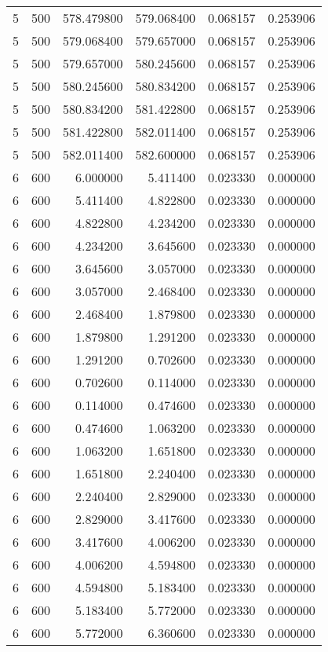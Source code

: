 \begin{longtable}{rrrrrr}
5 & 500 & 578.479800 & 579.068400 & 0.068157 & 0.253906 \\
5 & 500 & 579.068400 & 579.657000 & 0.068157 & 0.253906 \\
5 & 500 & 579.657000 & 580.245600 & 0.068157 & 0.253906 \\
5 & 500 & 580.245600 & 580.834200 & 0.068157 & 0.253906 \\
5 & 500 & 580.834200 & 581.422800 & 0.068157 & 0.253906 \\
5 & 500 & 581.422800 & 582.011400 & 0.068157 & 0.253906 \\
5 & 500 & 582.011400 & 582.600000 & 0.068157 & 0.253906 \\
6 & 600 & 6.000000 & 5.411400 & 0.023330 & 0.000000 \\
6 & 600 & 5.411400 & 4.822800 & 0.023330 & 0.000000 \\
6 & 600 & 4.822800 & 4.234200 & 0.023330 & 0.000000 \\
6 & 600 & 4.234200 & 3.645600 & 0.023330 & 0.000000 \\
6 & 600 & 3.645600 & 3.057000 & 0.023330 & 0.000000 \\
6 & 600 & 3.057000 & 2.468400 & 0.023330 & 0.000000 \\
6 & 600 & 2.468400 & 1.879800 & 0.023330 & 0.000000 \\
6 & 600 & 1.879800 & 1.291200 & 0.023330 & 0.000000 \\
6 & 600 & 1.291200 & 0.702600 & 0.023330 & 0.000000 \\
6 & 600 & 0.702600 & 0.114000 & 0.023330 & 0.000000 \\
6 & 600 & 0.114000 & 0.474600 & 0.023330 & 0.000000 \\
6 & 600 & 0.474600 & 1.063200 & 0.023330 & 0.000000 \\
6 & 600 & 1.063200 & 1.651800 & 0.023330 & 0.000000 \\
6 & 600 & 1.651800 & 2.240400 & 0.023330 & 0.000000 \\
6 & 600 & 2.240400 & 2.829000 & 0.023330 & 0.000000 \\
6 & 600 & 2.829000 & 3.417600 & 0.023330 & 0.000000 \\
6 & 600 & 3.417600 & 4.006200 & 0.023330 & 0.000000 \\
6 & 600 & 4.006200 & 4.594800 & 0.023330 & 0.000000 \\
6 & 600 & 4.594800 & 5.183400 & 0.023330 & 0.000000 \\
6 & 600 & 5.183400 & 5.772000 & 0.023330 & 0.000000 \\
6 & 600 & 5.772000 & 6.360600 & 0.023330 & 0.000000 \\

\end{longtable}
